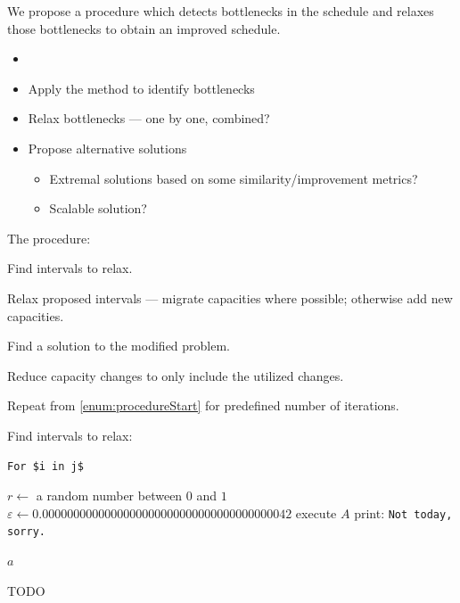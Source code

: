 We propose a procedure which detects bottlenecks in the schedule and relaxes those bottlenecks to obtain
an improved schedule.

\begin{itemize}
    \item 

    \item Apply the method to identify bottlenecks
    \item Relax bottlenecks --- one by one, combined?
    \item Propose alternative solutions
    \begin{itemize}
        \item Extremal solutions based on some similarity/improvement metrics?
        \item Scalable solution?
    \end{itemize}
\end{itemize}

The procedure:

\begin{steps}
    \item Find intervals to relax. \label{enum:procedureStart}
    \item Relax proposed intervals --- migrate capacities where possible; otherwise add new capacities.
    \item Find a solution to the modified problem.
    \item Reduce capacity changes to only include the utilized changes.
    \item Repeat from \cref{enum:procedureStart} for predefined number of iterations.
\end{steps}

Find intervals to relax:

\begin{verbatim}
For $i in j$
\end{verbatim}


\begin{algorithm}
\begin{algorithmic}
	\State $r \gets$ a random number between $0$ and $1$
	\State $\varepsilon \gets 0.0000000000000000000000000000000000000042$
		\State execute $A$ 
	\Else
		\State print: \texttt{Not today, sorry.}
        \EndIf


    \State $a$
\EndFunction
\end{algorithmic}
\caption{TODO}
\label{alg:findIntervalsToRelax}
\end{algorithm}
 